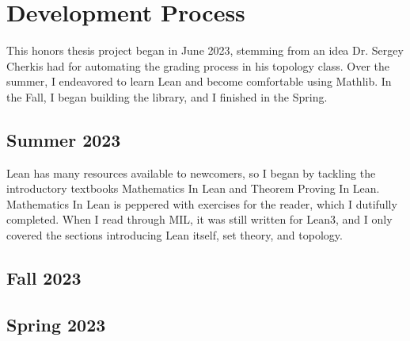 

\chapter[Development]{Development Process}

This honors thesis project began in June 2023, stemming from
an idea Dr. Sergey Cherkis had for automating the grading
process in his topology class. Over the summer, I endeavored
to learn Lean and become comfortable using Mathlib. In the Fall,
I began building the library, and I finished in the Spring.

\section{Summer 2023}

Lean has many resources available to newcomers, so I began
by tackling the introductory textbooks Mathematics In Lean and
Theorem Proving In Lean. Mathematics In Lean is peppered with
exercises for the reader, which I dutifully completed. When
I read through MIL, it was still written for Lean3, and I only 
covered the sections introducing Lean itself, set theory, and
topology. 

\section{Fall 2023}

\section{Spring 2023}
